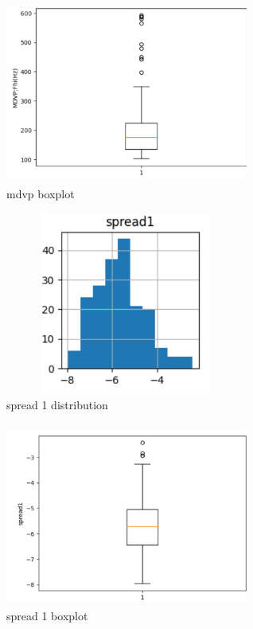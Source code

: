 \documentclass[conference]{IEEEtran}
\begin{document}
  \begin{figure}[!ht]
     \centering
     \includegraphics[height=6cm,width=8cm]{mdvp_outliers.png}
    \caption{mdvp boxplot}
    \label{fig:8}
 \end{figure}

 
   \begin{figure}[!ht]
     \centering
     \includegraphics[height=6cm,width=8cm]{spread1.png}
    \caption{spread 1 distribution}
    \label{fig:8}
 \end{figure}


 
   \begin{figure}[!ht]
     \centering
     \includegraphics[height=6cm,width=8cm]{spread1_out.png}
    \caption{spread 1 boxplot}
    \label{fig:8}
 \end{figure}
\end{document}
